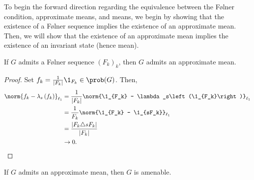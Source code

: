To begin the forward direction regarding the equivalence between the Følner condition, approximate means, and means, we begin by showing that the existence of a Følner sequence implies the existence of an approximate mean. Then, we will show that the existence of an approximate mean implies the existence of an invariant state (hence mean).
\begin{proposition}\label{prop:folner_implies_approx_mean}
  If $G$ admits a Følner sequence $\left(F_k\right)_k$, then $G$ admits an approximate mean.
\end{proposition}
\begin{proof}
  Set $f_k = \frac{1}{\left\vert F_k \right\vert}\1_{F_k}\in \prob(G)$. Then,
  \begin{align*}
    \norm{f_k - \lambda_s\left(f_k\right)}_{\ell_1} &= \frac{1}{\left\vert F_k \right\vert} \norm{\1_{F_k} - \lambda_s\left(\1_{F_k}\right)}_{\ell_1}\\
                                                    &= \frac{1}{F_k}\norm{\1_{F_k} - \1_{sF_k}}_{\ell_1}\\
                                               &= \frac{\left\vert F_k\triangle sF_k \right\vert}{\left\vert F_k \right\vert}\\
                                               &\rightarrow 0.
  \end{align*}
\end{proof}
\begin{proposition}\label{prop:approx_mean_implies_amenable}
  If $G$ admits an approximate mean, then $G$ is amenable.
\end{proposition}
